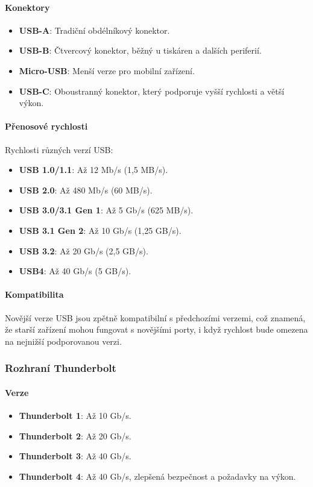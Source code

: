 \paragraph{Konektory}
\begin{itemize}
\item \textbf{USB-A}: Tradiční obdélníkový konektor.
\item \textbf{USB-B}: Čtvercový konektor, běžný u tiskáren a dalších periferií.
\item \textbf{Micro-USB}: Menší verze pro mobilní zařízení.
\item \textbf{USB-C}: Oboustranný konektor, který podporuje vyšší rychlosti a větší výkon.
\end{itemize}

\paragraph{Přenosové rychlosti}
Rychlosti různých verzí USB:
\begin{itemize}
\item \textbf{USB 1.0/1.1}: Až 12 Mb/s (1,5 MB/s).
\item \textbf{USB 2.0}: Až 480 Mb/s (60 MB/s).
\item \textbf{USB 3.0/3.1 Gen 1}: Až 5 Gb/s (625 MB/s).
\item \textbf{USB 3.1 Gen 2}: Až 10 Gb/s (1,25 GB/s).
\item \textbf{USB 3.2}: Až 20 Gb/s (2,5 GB/s).
\item \textbf{USB4}: Až 40 Gb/s (5 GB/s).
\end{itemize}

\paragraph{Kompatibilita}
Novější verze USB jsou zpětně kompatibilní s předchozími verzemi, což znamená, že starší zařízení mohou fungovat s novějšími porty, i když rychlost bude omezena na nejnižší podporovanou verzi.

\subsubsection{Rozhraní Thunderbolt}

\paragraph{Verze}
\begin{itemize}
\item \textbf{Thunderbolt 1}: Až 10 Gb/s.
\item \textbf{Thunderbolt 2}: Až 20 Gb/s.
\item \textbf{Thunderbolt 3}: Až 40 Gb/s.
\item \textbf{Thunderbolt 4}: Až 40 Gb/s, zlepšená bezpečnost a požadavky na výkon.
\end{itemize}

